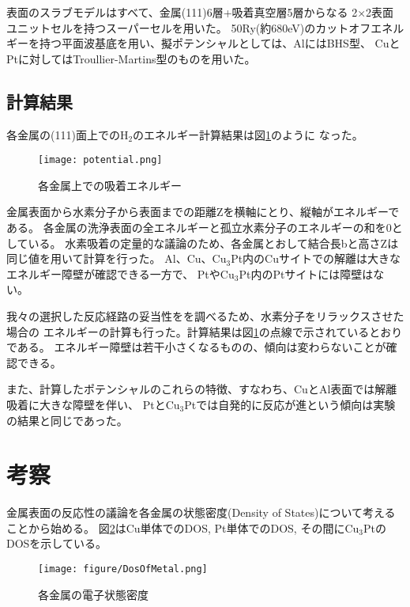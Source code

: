 \documentclass[12pt]{ltjsarticle}
\begin{document}
表面のスラブモデルはすべて、金属(111)6層+吸着真空層5層からなる
2×2表面ユニットセルを持つスーパーセルを用いた。
50Ry(約680eV)のカットオフエネルギーを持つ平面波基底を用い、擬ポテンシャルとしては、AlにはBHS型、
CuとPtに対してはTroullier-Martins型のものを用いた。

\subsection{計算結果}
各金属の(111)面上での$\text{H}_\text{2}$のエネルギー計算結果は図\ref{fig:potential}のように
なった。\\

\begin{figure}[hbtp]
    \begin{center}
     \texttt{[image: potential.png]}
    \end{center}
    \caption{各金属上での吸着エネルギー}
    \label{fig:potential}
\end{figure}

金属表面から水素分子から表面までの距離Zを横軸にとり、縦軸がエネルギーである。
各金属の洗浄表面の全エネルギーと孤立水素分子のエネルギーの和を0としている。
水素吸着の定量的な議論のため、各金属とおして結合長bと高さZは同じ値を用いて計算を行った。
Al、Cu、$\text{Cu}_\text{3}$Pt内のCuサイトでの解離は大きなエネルギー障壁が確認できる一方で、
Ptや$\text{Cu}_\text{3}$Pt内のPtサイトには障壁はない。

我々の選択した反応経路の妥当性をを調べるため、水素分子をリラックスさせた場合の
エネルギーの計算も行った。計算結果は図\ref{fig:potential}の点線で示されているとおりである。
エネルギー障壁は若干小さくなるものの、傾向は変わらないことが確認できる。

また、計算したポテンシャルのこれらの特徴、すなわち、CuとAl表面では解離吸着に大きな障壁を伴い、
Ptと$\text{Cu}_\text{3}$Ptでは自発的に反応が進という傾向は実験の結果と同じであった。

\section{考察}

金属表面の反応性の議論を各金属の状態密度(Density of States)について考えることから始める。
図\ref{fig:dosmetal}はCu単体でのDOS, Pt単体でのDOS, その間に$\text{Cu}_\text{3}$Ptの
DOSを示している。

\begin{figure}[hbtp]
    \begin{center}
     \texttt{[image: figure/DosOfMetal.png]}
    \end{center}
    \caption{各金属の電子状態密度}
    \label{fig:dosmetal}
\end{figure}
\end{document}
